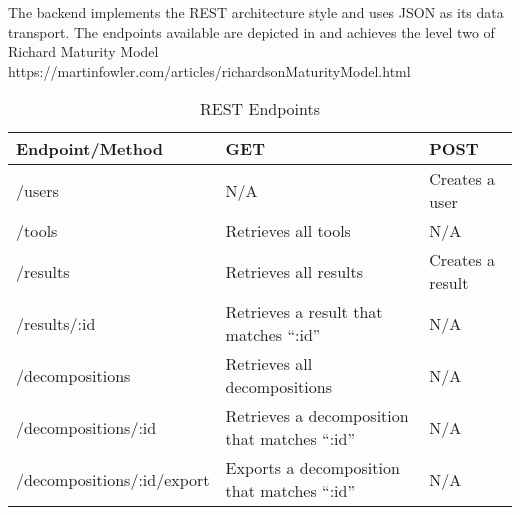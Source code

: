 The backend implements the REST architecture style and uses JSON as its data transport. The endpoints available are depicted in  and achieves the level two of Richard Maturity Model https://martinfowler.com/articles/richardsonMaturityModel.html

\begin{table}[!htb] \caption{REST Endpoints} \label{tab:rest_endpoints}
  \begin{center}
    \begin{tabular}[c]{p{12em}|p{12em}|p{12em}}
      \textbf{Endpoint/Method} &
      \textbf{GET} &
      \textbf{POST} \\
      \hline {/users} & N/A & Creates a user \\
      \hline {/tools} & Retrieves all tools & N/A \\
      \hline {/results} & Retrieves all results & Creates a result \\
      \hline {/results/:id} & Retrieves a result that matches ``:id'' & N/A \\
      \hline {/decompositions} & Retrieves all decompositions & N/A \\
      \hline {/decompositions/:id} & Retrieves a decomposition that matches ``:id'' & N/A \\
      \hline {/decompositions/:id/export} & Exports a decomposition that matches ``:id'' & N/A \\
    \end{tabular}
  \end{center}
\end{table}
